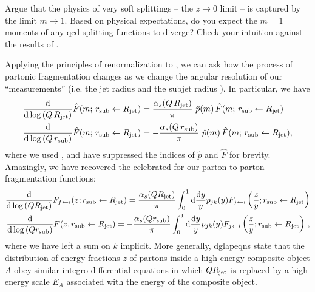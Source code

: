 \begin{exercise}
    Argue that the physics of very soft splittings -- the \(z \to 0\) limit -- is captured by the limit \(m \to 1\).
    Based on physical expectations, do you expect the \(m=1\) moments of any \gls{qcd} splitting functions to diverge?
    Check your intuition against the results of .
\end{exercise}



Applying the principles of renormalization to , we can ask how the process of partonic fragmentation changes as we change the angular resolution of our ``measurements'' (i.e. the jet radius \Rjet{} and the subjet radius \rsub{}).
%
In particular, we have
\begin{subequations}
\begin{align}
    \label{eq:fragmentation_dglap_upper}
    \frac{\dd}{\dd\log\le(Q\,\Rjet\ri)} \hat{F}(m;\,\rsub\leftarrow \Rjet)
    &=
    \frac{\alpha_s(Q\,\Rjet)}{\pi}
    \,\,
    \hat{p}(m)
    \,
    \hat{F}(m;\,\rsub\leftarrow \Rjet)
    \\
    \label{eq:fragmentation_dglap_lower}
    \frac{\dd}{\dd\log\le(Q\,\rsub\ri)} \hat{F}(m;\,\rsub\leftarrow \Rjet)
    &=
    -\frac{\alpha_s(Q\,\rsub)}{\pi}
    \,\,
    \hat{p}(m)
    \,
    \hat{F}(m;\,\rsub\leftarrow \Rjet)
    ,
\end{align}
\end{subequations}
where we used , and have suppressed the indices of \(\hat{p}\) and \(\hat{F}\) for brevity.
%
Amazingly, we have recovered the celebrated  \cite{Gribov:1972ri,Dokshitzer:1977sg,Altarelli:1977zs} for our parton-to-parton fragmentation functions:
\begin{align}
    \frac{\dd}{\dd\log\left(Q R_\text{jet}\right)}
    F_{f\leftarrow i}(z; r_\text{sub} \leftarrow R_\text{jet})
    =
    \frac{\alpha_s(QR_\text{jet})}{\pi}
    \int_0^1
    \dd \frac{\dd y}{y}
    p_{j k}(y)
    F_{j\leftarrow i}\left(\frac{z}{y}; r_\text{sub} \leftarrow R_\text{jet}\right)
    \\
    \frac{\dd}{\dd\log\left(Q r_\text{sub}\right)}
    F(z, r_\text{sub} \leftarrow R_\text{jet})
    =
    -
    \frac{\alpha_s(Qr_\text{sub})}{\pi}
    \int_0^1
    \dd \frac{\dd y}{y}
    p_{j k}(y)
    F_{j\leftarrow i}\left(\frac{z}{y}; r_\text{sub} \leftarrow R_\text{jet}\right)
    \,,
\end{align}
where we have left a sum on \(k\) implicit.
%
More generally, \glspl{dglapeqn} state that the distribution of energy fractions \(z\) of partons inside a high energy composite object \(A\) obey similar integro-differential equations in which \(QR_\text{jet}\) is replaced by a high energy scale \(E_A\) associated with the energy of the composite object.


